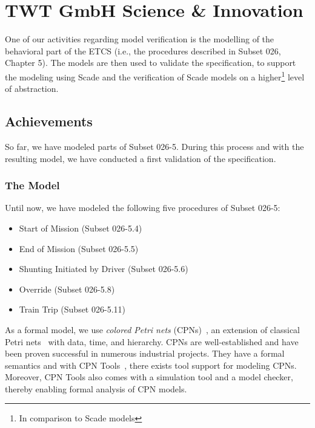 \section{TWT GmbH Science \& Innovation}

One of our activities regarding model verification is the modelling of the behavioral part of the ETCS (i.e., the procedures described in Subset 026, Chapter 5). The models are then used to validate the specification, to support the modeling using Scade and the verification of Scade models on a higher\footnote{In comparison to Scade models} level of abstraction.

\subsection{Achievements}

So far, we have modeled parts of Subset 026-5. During this process and with the resulting model, we have conducted a first validation of the specification.

\subsubsection{The Model}

Until now, we have modeled the following five procedures of Subset 026-5:
\begin{itemize}
	\item Start of Mission (Subset 026-5.4)
	\item End of Mission (Subset 026-5.5)
	\item Shunting Initiated by Driver (Subset 026-5.6)
	\item Override (Subset 026-5.8)
	\item Train Trip (Subset 026-5.11)
\end{itemize}

As a formal model, we use \textit{colored Petri nets} (CPNs)~\cite{CPN-book}, an extension of classical Petri nets~\cite{PNbook} with data, time, and hierarchy. CPNs are well-established and have been proven successful in numerous industrial projects. They have a formal semantics and with CPN Tools~\cite{Westergaard2013apn}, there exists tool support for modeling CPNs. Moreover, CPN Tools also comes with a simulation tool and a model checker, thereby enabling formal analysis of CPN models. 

